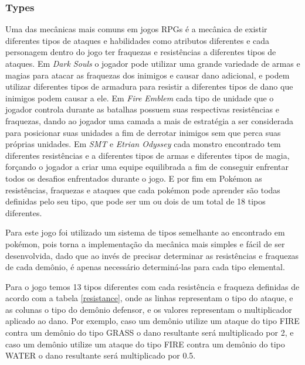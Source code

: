 \documentclass[
	12pt,				%
	openright,			%
	twoside,			%
	a4paper,			%
	english,			%
	french,				%
	spanish,			%
	brazil				%
	]{abntex2}
\begin{document}
\subsubsection{Types}

Uma das mecânicas mais comuns em jogos RPGs é a mecânica de existir diferentes tipos de ataques e habilidades como atributos diferentes e cada personagem dentro do jogo ter fraquezas e resistências a diferentes tipos de ataques. Em \emph{Dark Souls} o jogador pode utilizar uma grande variedade de armas e magias para atacar as fraquezas dos inimigos e causar dano adicional, e podem utilizar diferentes tipos de armadura para resistir a diferentes tipos de dano que inimigos podem causar a ele. Em \emph{Fire Emblem} cada tipo de unidade que o jogador controla durante as batalhas possuem suas respectivas resistências e fraquezas, dando ao jogador uma camada a mais de estratégia a ser considerada para posicionar suas unidades a fim de derrotar inimigos sem que perca suas próprias unidades. Em \emph{SMT} e \emph{Etrian Odyssey} cada monstro encontrado tem diferentes resistências e  a diferentes tipos de armas e diferentes tipos de magia, forçando o jogador a criar uma equipe equilibrada a fim de conseguir enfrentar todos os desafios enfrentados durante o jogo. E por fim em Pokémon as resistências, fraquezas e ataques que cada pokémon pode aprender são todas definidas pelo seu tipo, que pode ser um ou dois de um total de 18 tipos diferentes.

Para este jogo foi utilizado um sistema de tipos semelhante ao encontrado em pokémon, pois torna a implementação da mecânica mais simples e fácil de ser desenvolvida, dado que ao invés de precisar determinar as resistências e fraquezas de cada demônio, é apenas necessário determiná-las para cada tipo elemental.

Para o jogo temos 13 tipos diferentes com cada resistência e fraqueza definidas de acordo com a tabela \ref{resistance}, onde as linhas representam o tipo do ataque, e as colunas o tipo do demônio defensor, e os valores representam o multiplicador aplicado ao dano. Por exemplo, caso um demônio utilize um ataque do tipo FIRE contra um demônio do tipo GRASS o dano resultante será multiplicado por 2, e caso um demônio utilize um ataque do tipo FIRE contra um demônio do tipo WATER o dano resultante será multiplicado por 0.5.
\end{document}
